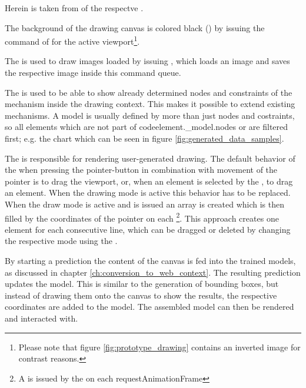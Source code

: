 Herein  is taken from  of the respectve  .

The background of the drawing canvas is colored black () by issuing the  command of  for the active viewport\footnote{Please note that figure \ref{fig:prototype_drawing} contains an inverted image for contrast reasons.}.

The  is used to draw images loaded by issuing , which loads an image and saves the respective image inside this command queue.

The  is used to be able to show already determined nodes and constraints of the mechanism inside the drawing context.
This makes it possible to extend existing mechanisms.
A  model is usually defined by more than just nodes and costraints, so all elements which are not part of code{element.\_model.nodes} or  are filtered first; e.g. the chart which can be seen in figure \ref{fig:generated_data_samples}.

The  is responsible for rendering user-generated drawing.
The default behavior of the  when pressing the pointer-button in combination with movement of the pointer is to drag the viewport, or, when an element is selected by the , to drag an element.
When the drawing mode is active this behavior has to be replaced.
When the draw mode is active and  is issued an array is created which is then filled by the coordinates of the pointer on each \footnote{A  is issued by the  on each requestAnimationFrame}.
This approach creates one  element for each consecutive line, which can be dragged or deleted by changing the respective mode using the  .

By starting a prediction the content of the canvas is fed into the trained models, as discussed in chapter \ref{ch:conversion_to_web_context}.
The resulting prediction updates the  model.
This is similar to the generation of bounding boxes, but instead of drawing them onto the canvas to show the results, the respective coordinates are added to the  model.
The assembled  model can then be rendered and interacted with.

